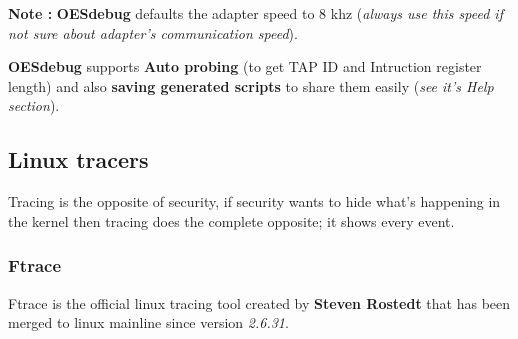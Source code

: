 \begin{enumerate}
\begin{enumerate}
\textbf{\color{orange}Note :} \textbf{OESdebug} defaults the adapter speed to 8 khz (\textit{always use this speed if not sure about adapter's communication speed}). 	 
\begin{center}
\begin{mdframed}[
        linecolor=red,linewidth=2pt,%
        frametitlerule=true,%
        apptotikzsetting={\tikzset{mdfframetitlebackground/.append style={%
            shade,left color=white, right color=blue!20}}}, 
        frametitlerulecolor=blue,
        frametitlerulewidth=1pt, innertopmargin=\topskip,
        frametitle={OESdebug Extra features},
        outerlinewidth=1.25pt
    ]
	\textbf{OESdebug} supports \textbf{Auto probing} (to get TAP ID and Intruction register length) and also \textbf{saving generated scripts}  to share them easily (\textit{see it's Help section}).
\end{mdframed}
\end{center}

	\end{enumerate}
	
	
		
\end{enumerate}
	



\subsection{Linux tracers}
Tracing is the opposite of security, if security wants to hide what's happening in the kernel then tracing does the complete opposite; it shows every event.

\subsubsection{Ftrace}
Ftrace is the official linux tracing tool created by \og \textbf{Steven Rostedt} \fg that has been merged to linux mainline since version \emph{2.6.31}.

